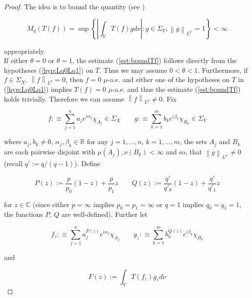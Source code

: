 \begin{proof}
	The idea is to bound the quantity (see \cite[189]{folland:real_analysis:1999})
	
	\begin{equation*}
		M_q\left( T(f) \right) = \sup\left\{ \left| \int_Y T(f)g d\nu\right| : g \in \Sigma_Y, \left\| g\right\|_{L^{q'}} = 1\right\} < \infty
	\end{equation*}

	appropriately.\\
	If either $\theta = 0$ or $\theta = 1$, the estimate (\ref{est:boundTf}) follows directly from the hypotheses (\ref{hyp:Lq0Lq1}) on $T$. Thus we may assume \underline{$0 < \theta < 1$}. Furthermore, if $f \in \Sigma_X$, $\left\| f \right\|_{L^p} = 0$, then $f = 0$ $\mu$-a.e. and either one of the hypotheses on $T$ in (\ref{hyp:Lq0Lq1}) implies $T(f) = 0$ $\mu$-a.e. and thus the estimate (\ref{est:boundTf}) holds trivially. Therefore we can assume \underline{$\left\| f\right\|_{L^p} \neq 0$}. Fix 
	
\begin{equation*}
	f :\equiv \sum_{j = 1}^n a_j e^{i\alpha_j}\chi_{A_j} \in \Sigma_X \qquad g :\equiv \sum_{k = 1}^m b_k e^{i\beta_k}\chi_{B_k} \in \Sigma_Y
\end{equation*}

where $a_j,b_k \neq 0$, $\alpha_j,\beta_k \in \mathbb{R}$ for any $j = 1,\dots,n$, $k = 1,\dots,m$, the sets $A_j$ and $B_k$ are each pairwise disjoint with $\mu\left( A_j \right),\nu\left( B_k \right) < \infty$ and so, that $\left\| g\right\|_{L^{q'}} \neq 0$ (recall $q' := q/\left( q - 1 \right)$). Define

\begin{equation*}
	P(z) := \frac{p}{p_0}(1 - z) + \frac{p}{p_1}z \qquad Q(z) := \frac{q'}{q'_0}(1 - z) + \frac{q'}{q'_1}z
\end{equation*}

for $z \in \mathbb{C}$ (since either $p = \infty$ implies $p_0 = p_1 = \infty$ or $q = 1$ implies $q_0 = q_1 = 1$, the functions $P$, $Q$ are well-defined). Further let
				
\begin{equation}
	f_z :\equiv \sum_{j = 1}^n a^{P(z)}_j e^{i\alpha_j}\chi_{A_j} \qquad g_z :\equiv  \sum_{k = 1}^m b^{Q(z)}_k e^{i\beta_k}\chi_{B_k}
	\label{def:fzgz}
\end{equation}
				
and 

\begin{equation}
	F(z) := \int_Y T(f_z)g_zd\nu
	\label{eq:def_F}
\end{equation}


\end{proof}
